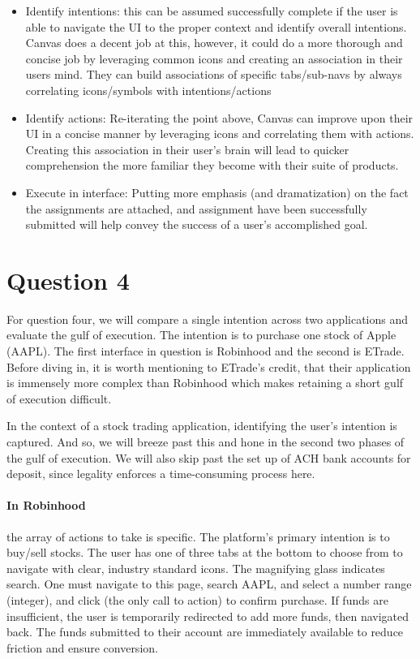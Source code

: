 \begin{itemize}
\item
Identify intentions: this can be assumed successfully complete if the user is able to navigate the UI to the proper context and identify overall intentions. Canvas does a decent job at this, however, it could do a more thorough and concise job by leveraging common icons and creating an association in their users mind. They can build associations of specific tabs/sub-navs by always correlating icons/symbols with intentions/actions
\item
Identify actions: Re-iterating the point above, Canvas can improve upon their UI in a concise manner by leveraging icons and correlating them with actions. Creating this association in their user's brain will lead to quicker comprehension the more familiar they become with their suite of products.
\item
Execute in interface: Putting more emphasis (and dramatization) on the fact the assignments are attached, and assignment have been successfully submitted will help convey the success of a user's accomplished goal.
\end{itemize}

\section{Question 4}

For question four, we will compare a single intention across two applications and evaluate the gulf of execution. The intention is to purchase one stock of Apple (AAPL). The first interface in question is Robinhood and the second is ETrade. Before diving in, it is worth mentioning to ETrade's credit, that their application is immensely more complex than Robinhood which makes retaining a short gulf of execution difficult.

In the context of a stock trading application, identifying the user's intention is captured. And so, we will breeze past this and hone in the second two phases of the gulf of execution. We will also skip past the set up of ACH bank accounts for deposit, since legality enforces a time-consuming process here.

\paragraph{In Robinhood}
the array of actions to take is specific. The platform's primary intention is to buy/sell stocks. The user has one of three tabs at the bottom to choose from to navigate with clear, industry standard icons. The magnifying glass indicates search. One must navigate to this page, search AAPL, and select a number range (integer), and click (the only call to action) to confirm purchase. If funds are insufficient, the user is temporarily redirected to add more funds, then navigated back. The funds submitted to their account are immediately available to reduce friction and ensure conversion.

